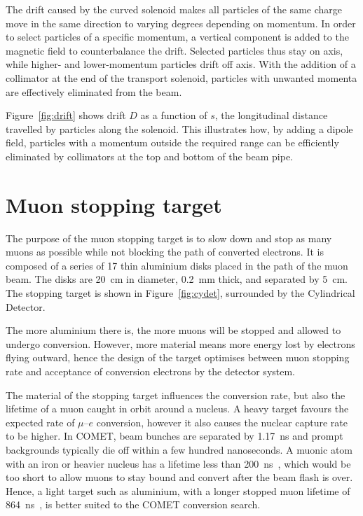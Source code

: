 The drift caused by the curved solenoid makes all particles of the same charge
move in the same direction to varying degrees depending on momentum. In order to
select particles of a specific momentum, a vertical component is added to the
magnetic field to counterbalance the drift. Selected particles thus stay on
axis, while higher- and lower-momentum particles drift off axis. With the addition
of a collimator at the end of the transport solenoid, particles with unwanted
momenta are effectively eliminated from the beam.

Figure~\ref{fig:drift} shows drift $D$ as a function of $s$, the longitudinal
distance travelled by particles along the solenoid. This illustrates how, by
adding a dipole field, particles with a momentum outside the required range can
be efficiently eliminated by collimators at the top and bottom of the beam pipe.

\section{Muon stopping target}\label{sec:stopping_target}
The purpose of the muon stopping target is to slow down and stop as many muons
as possible while not blocking the path of converted electrons. It is composed
of a series of 17 thin aluminium disks placed in the path of the muon beam. The
disks are \SI{20}{\cm} in diameter, \SI{0.2}{\mm} thick, and separated by
\SI{5}{\cm}. The stopping target is shown in Figure~\ref{fig:cydet}, surrounded
by the Cylindrical Detector.

The more aluminium there is, the more muons will be stopped and allowed to
undergo conversion. However, more material means more energy lost by electrons
flying outward, hence the design of the target optimises between muon stopping
rate and acceptance of conversion electrons by the detector system.


The material of the stopping target influences the conversion rate, but also the
lifetime of a muon caught in orbit around a nucleus. A heavy target favours the
expected rate of $\mu$--$e$ conversion, however it also causes the nuclear
capture rate to be higher. In COMET, beam bunches are separated by
\SI{1.17}{\ns} and prompt backgrounds typically die off within a few hundred
nanoseconds. A muonic atom with an iron or heavier nucleus has a lifetime less
than \SI{200}{\ns}~\cite{ben_thesis}, which would be too short to allow muons to
stay bound and convert after the beam flash is over. Hence, a light target such
as aluminium, with a longer stopped muon lifetime of
\SI{864}{\ns}~\cite{PhysRevC.35.2212}, is better suited to the COMET conversion
search.

